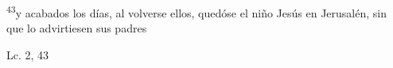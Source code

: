 \documentclass[../../rosario.tex]{subfiles}
\begin{document}
    \textsuperscript{43}y acabados los días, al volverse ellos, quedóse el niño Jesús en Jerusalén, sin que lo advirtiesen sus padres
    \begin{flushright}
    Lc. 2, 43        
    \end{flushright}
\end{document}
